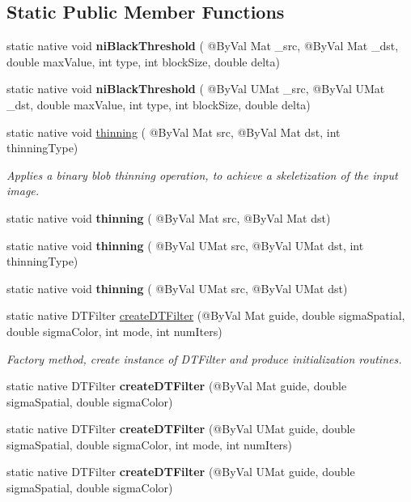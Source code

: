 \subsection*{Static Public Member Functions}
\begin{DoxyCompactItemize}
\item 
static native void {\bfseries ni\+Black\+Threshold} ( @By\+Val Mat \+\_\+src, @By\+Val Mat \+\_\+dst, double max\+Value, int type, int block\+Size, double delta)
\item 
static native void {\bfseries ni\+Black\+Threshold} ( @By\+Val U\+Mat \+\_\+src, @By\+Val U\+Mat \+\_\+dst, double max\+Value, int type, int block\+Size, double delta)
\item 
static native void \hyperlink{group__ximgproc_gaf281201400d757cb4921c49dcf729896}{thinning} ( @By\+Val Mat src, @By\+Val Mat dst, int thinning\+Type)
\begin{DoxyCompactList}\small\item\em Applies a binary blob thinning operation, to achieve a skeletization of the input image. \end{DoxyCompactList}\item 
static native void {\bfseries thinning} ( @By\+Val Mat src, @By\+Val Mat dst)
\item 
static native void {\bfseries thinning} ( @By\+Val U\+Mat src, @By\+Val U\+Mat dst, int thinning\+Type)
\item 
static native void {\bfseries thinning} ( @By\+Val U\+Mat src, @By\+Val U\+Mat dst)
\item 
static native D\+T\+Filter \hyperlink{group__ximgproc__filters_ga813031e38babc7f53070fcf67dbfea40}{create\+D\+T\+Filter} (@By\+Val Mat guide, double sigma\+Spatial, double sigma\+Color, int mode, int num\+Iters)
\begin{DoxyCompactList}\small\item\em Factory method, create instance of D\+T\+Filter and produce initialization routines. \end{DoxyCompactList}\item 
static native D\+T\+Filter {\bfseries create\+D\+T\+Filter} (@By\+Val Mat guide, double sigma\+Spatial, double sigma\+Color)
\item 
static native D\+T\+Filter {\bfseries create\+D\+T\+Filter} (@By\+Val U\+Mat guide, double sigma\+Spatial, double sigma\+Color, int mode, int num\+Iters)
\item 
static native D\+T\+Filter {\bfseries create\+D\+T\+Filter} (@By\+Val U\+Mat guide, double sigma\+Spatial, double sigma\+Color)

\end{DoxyCompactItemize}
